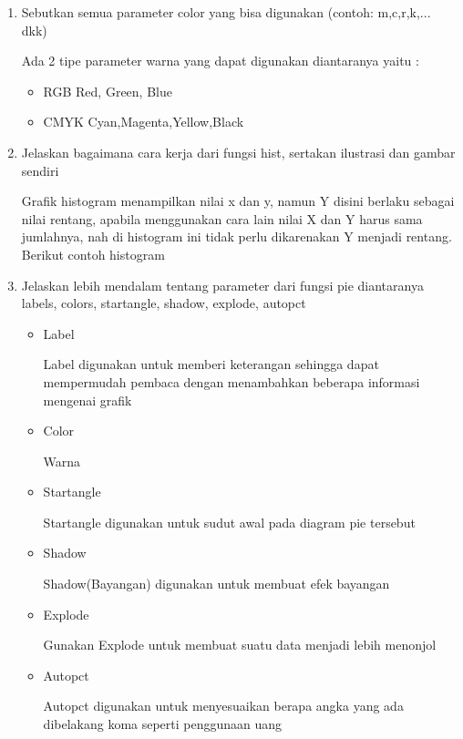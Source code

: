 \begin{enumerate}
\item Sebutkan semua parameter color yang bisa digunakan (contoh: m,c,r,k,... dkk)

	Ada 2 tipe parameter warna yang dapat digunakan diantaranya yaitu : 
\begin{itemize}
	\item RGB
	Red, Green, Blue
    \item CMYK
    Cyan,Magenta,Yellow,Black
\end{itemize}

\item Jelaskan bagaimana cara kerja dari fungsi hist, sertakan ilustrasi dan gambar sendiri

	Grafik histogram menampilkan nilai x dan y, namun Y disini berlaku sebagai nilai rentang, apabila menggunakan cara lain nilai X dan Y harus sama jumlahnya, nah di histogram ini tidak perlu dikarenakan Y menjadi rentang. Berikut contoh histogram


\item Jelaskan lebih mendalam tentang parameter dari fungsi pie diantaranya labels, colors, startangle, shadow, explode, autopct

\begin{itemize}
    \item Label
    
    Label digunakan untuk memberi keterangan sehingga dapat mempermudah pembaca dengan menambahkan beberapa informasi mengenai grafik
    
    \item Color
    
    Warna 
    
    \item Startangle
    
    Startangle digunakan untuk sudut awal pada diagram pie tersebut
    
    \item Shadow
    
    Shadow(Bayangan) digunakan untuk membuat efek bayangan
    
    \item Explode

    Gunakan Explode untuk membuat suatu data menjadi lebih menonjol
    
    \item Autopct
    
    Autopct digunakan untuk menyesuaikan berapa angka yang ada dibelakang koma seperti penggunaan uang
\end{itemize}
\end{enumerate}
